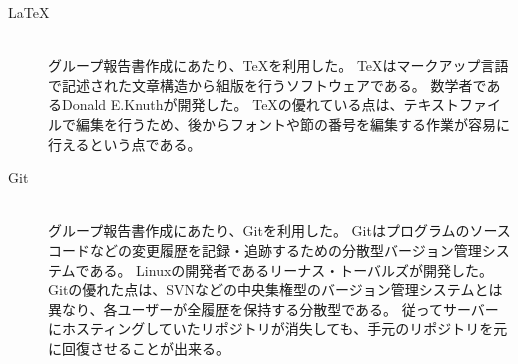 \documentclass[../report]{subfiles}
\begin{document}
\begin{description}
    \item[LaTeX] \mbox{} \\
        グループ報告書作成にあたり、TeXを利用した。
        TeXはマークアップ言語で記述された文章構造から組版を行うソフトウェアである。
        数学者であるDonald E.Knuthが開発した。
        TeXの優れている点は、テキストファイルで編集を行うため、後からフォントや節の番号を編集する作業が容易に行えるという点である。
    \item[Git] \mbox{} \\
        グループ報告書作成にあたり、Gitを利用した。
        Gitはプログラムのソースコードなどの変更履歴を記録・追跡するための分散型バージョン管理システムである。
        Linuxの開発者であるリーナス・トーバルズが開発した。
        Gitの優れた点は、SVNなどの中央集権型のバージョン管理システムとは異なり、各ユーザーが全履歴を保持する分散型である。
        従ってサーバーにホスティングしていたリポジトリが消失しても、手元のリポジトリを元に回復させることが出来る。
\end{description}
\end{document}
